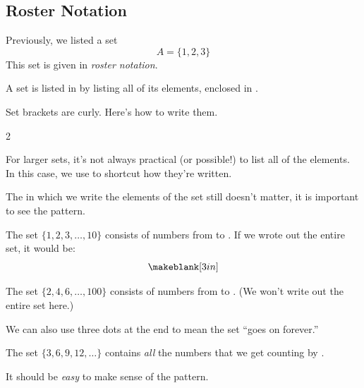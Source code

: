 \subsection{Roster Notation} 
Previously, we listed a set
\[
A=\{1,2,3\}
\]
This set is given in \emph{roster notation}.
\begin{definition}
A set is listed in  by listing all of its elements, enclosed in .
\end{definition}
\begin{Note}Set brackets are curly. Here's how to write them.
\begin{cpic}{}{2}
\end{cpic}
\end{Note}
For larger sets, it's not always practical (or possible!) to list all of the elements. In this case, we use \makeblank to shortcut how they're written.
\begin{Note}
The \makeblank in which we write the elements of the set still doesn't matter, it is important to see the pattern.
\end{Note}
\begin{Example}
The set $\{1,2,3,\dots,10\}$ consists of \makeblank[1in] numbers from \makeblanksmall to \makeblanksmall. If we wrote out the entire set, it would be:
\[
\makeblank[3in]
\]
\end{Example}
\begin{Example}
The set $\{2,4,6,\dots,100\}$ consists of \makeblank[1in] numbers from \makeblanksmall to \makeblanksmall. (We won't write out the entire set here.)
\end{Example}
We can also use three dots at the end to mean the set ``goes on forever.''
\begin{Example}
The set $\{3,6,9,12,\dots\}$ contains \emph{all} the numbers that we get counting by \makeblank[1in].
\end{Example}
It should be \emph{easy} to make sense of the pattern.
